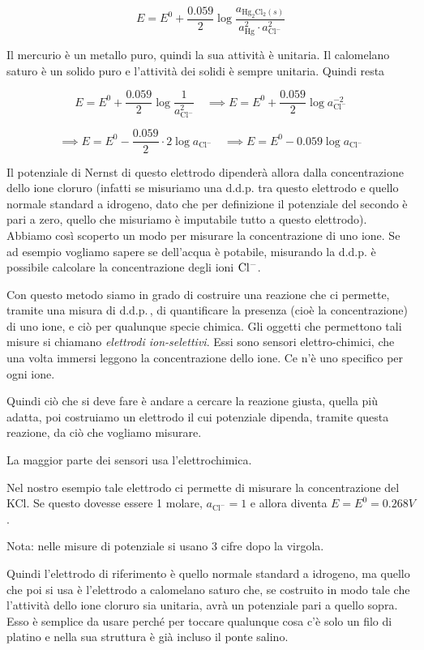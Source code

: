 $$E=E^0 + \frac{0.059}{2} \log \frac{a_{\text{Hg}_2\text{Cl}_2(s)}}{a^2_{\text{Hg}} \cdot a^2_{\text{Cl}^-}}$$

Il mercurio è un metallo puro, quindi la sua attività è unitaria. Il calomelano saturo è un solido puro e l'attività dei solidi è sempre unitaria. Quindi resta

$$E=E^0 + \frac{0.059}{2} \log \frac{1}{a^2_{\text{Cl}^-}}\quad
\implies E=E^0 + \frac{0.059}{2} \log a^{-2}_{\text{Cl}^-}$$

$$\implies E=E^0 - \frac{0.059}{2} \cdot 2 \log a_{\text{Cl}^-}
\quad
\implies E=E^0 - 0.059 \log a_{\text{Cl}^-}$$

Il potenziale di Nernst di questo elettrodo dipenderà allora dalla concentrazione dello ione cloruro (infatti se misuriamo una d.d.p. tra questo elettrodo e quello normale standard a idrogeno, dato che per definizione il potenziale del secondo è pari a zero, quello che misuriamo è imputabile tutto a questo elettrodo). Abbiamo così scoperto un modo per misurare la concentrazione di uno ione. Se ad esempio vogliamo sapere se dell'acqua è potabile, misurando la d.d.p. è possibile calcolare la concentrazione degli ioni $\rm Cl^-$.

Con questo metodo siamo in grado di costruire una reazione che ci permette, tramite una misura di d.d.p.\,, di quantificare la presenza (cioè la concentrazione) di uno ione, e ciò per qualunque specie chimica. Gli oggetti che permettono tali misure si chiamano \textit{elettrodi ion-selettivi}. Essi sono sensori elettro-chimici, che una volta immersi leggono la concentrazione dello ione. Ce n'è uno specifico per ogni ione.

Quindi ciò che si deve fare è andare a cercare la reazione giusta, quella più adatta, poi costruiamo un elettrodo il cui potenziale dipenda, tramite questa reazione, da ciò che vogliamo misurare.

La maggior parte dei sensori usa l'elettrochimica.

Nel nostro esempio tale elettrodo ci permette di misurare la concentrazione del KCl. Se questo dovesse essere 1 molare, $a_{\text{Cl}^-}=1$ e allora diventa $E=E^0=0.268 V$.

\vspace{0.2cm}Nota: nelle misure di potenziale si usano 3 cifre dopo la virgola.

\vspace{0.2cm}Quindi l'elettrodo di riferimento è quello normale standard a idrogeno, ma quello che poi si usa è l'elettrodo a calomelano saturo che, se costruito in modo tale che l'attività dello ione cloruro sia unitaria, avrà un potenziale pari a quello sopra. Esso è semplice da usare perché per toccare qualunque cosa c'è solo un filo di platino e nella sua struttura è già incluso il ponte salino.

